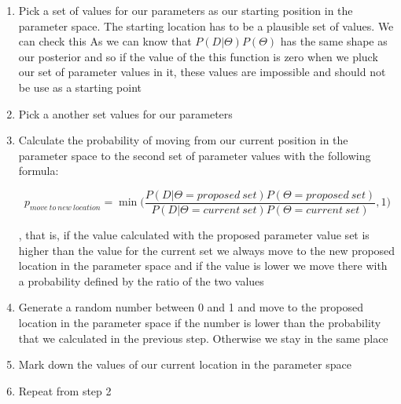 \documentclass[12pt,a4paper,leqno]{report}
\theoremstyle{plain}
\theoremstyle{definition}
\theoremstyle{remark}
\begin{document}
\begin{enumerate}
    \item Pick a set of values for our parameters as our starting position in the parameter space. The starting
    location has to be a plausible set of values. We can check this As we can know
    that \(P(D|\Theta)P(\Theta)\) has the same shape as our posterior and so if the value of the this function is zero when
    we pluck our set of parameter values in it, these values are impossible and should not be use as a starting point
    \item Pick a another set values for our parameters
    \item Calculate the probability of moving from our current position in the parameter space to the second set of parameter
    values with the following formula:

\begin{def}\label{randomwalk}
\begin{equation}
p_{move\ to\ new\ location} = \min \bigg(\frac{P(D|\Theta = proposed\ set)P(\Theta = proposed\ set)}{P(D|\Theta = current\ set)P(\Theta = current\ set)}, 1 \bigg)
\end{equation}
\end{def}
, that is, if the value calculated with the proposed parameter value set is higher than the value for the current set
we always move to the new proposed location in the parameter space and if the value is lower we move there
with a probability defined by the ratio of the two values

    \item Generate a random number between 0 and 1 and move to the proposed location
    in the parameter space if the number is lower than the probability that we calculated
    in the previous step. Otherwise we stay in the same place
    \item Mark down the values of our current location in the parameter space
    \item Repeat from step 2
    
\end{enumerate}
\end{document}
